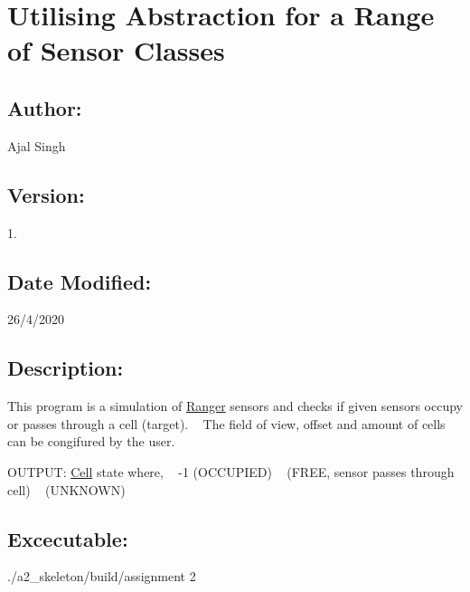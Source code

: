 \hypertarget{index_ac_index_more_info}{}\section{Utilising Abstraction for a Range of Sensor Classes}\label{index_ac_index_more_info}
\hypertarget{index_author}{}\subsection{Author\+:}\label{index_author}
Ajal Singh\hypertarget{index_version}{}\subsection{Version\+:}\label{index_version}
1.\hypertarget{index_date}{}\subsection{Date Modified\+:}\label{index_date}
26/4/2020\hypertarget{index_description}{}\subsection{Description\+:}\label{index_description}
This program is a simulation of \hyperlink{classRanger}{Ranger} sensors and checks if given sensors occupy or passes through a cell (target). ~\newline
 The field of view, offset and amount of cells can be congifured by the user.

O\+U\+T\+P\+UT\+: \hyperlink{classCell}{Cell} state where, ~\newline
 -\/1 (O\+C\+C\+U\+P\+I\+ED) ~ (F\+R\+EE, sensor passes through cell) ~ (U\+N\+K\+N\+O\+WN)\hypertarget{index_excecutable}{}\subsection{Excecutable\+:}\label{index_excecutable}
\begin{DoxyVerb}./a2_skeleton/build/assignment 2\end{DoxyVerb}
 